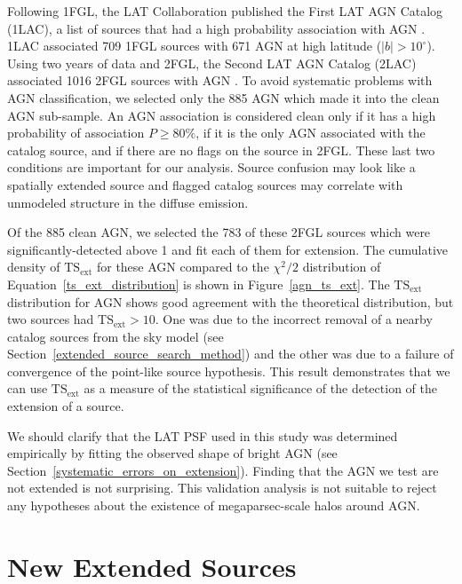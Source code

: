 \documentclass[12pt,preprint]{aastex}
\newcommand{\gev}{\text{GeV}\xspace}
\newcommand{\tsext}{{\ensuremath{\text{TS}_{\text{ext}}}}\xspace}
\newcommand{\degree}{^\circ\xspace}
\begin{document}
Following 1FGL, the LAT Collaboration published the First LAT AGN Catalog
(1LAC), a list of sources that had a high probability association with
AGN \citep{first_agn_cat}.  1LAC associated 709 1FGL sources with 671
AGN at high latitude ($|b|>10\degree$).  Using two years of data
and 2FGL, the Second LAT AGN Catalog (2LAC) associated 1016 2FGL sources
with AGN \citep{second_agn_cat}.  To avoid systematic problems with AGN
classification, we selected only the 885 AGN which made it into
the clean AGN sub-sample.  An AGN association is considered clean only
if it has a high probability of association $P\ge 80\%$, if it is the
only AGN associated with the catalog source, and if there are no flags
on the source in 2FGL. These last two conditions are important for our
analysis. Source confusion may look like a spatially extended source
and flagged catalog sources may correlate with unmodeled structure in
the diffuse emission.

Of the 885 clean AGN, we selected the 783 of these 2FGL sources which
were significantly-detected above 1 \gev and fit each of them for extension.
The cumulative density of \tsext for these AGN compared to the
$\chi^2/2$ distribution of Equation~\ref{ts_ext_distribution}
is
shown in Figure~\ref{agn_ts_ext}. 
The \tsext distribution for AGN shows good agreement with the
theoretical distribution, but two sources had $\tsext>10$.  One was due
to the incorrect removal of a nearby catalog sources from
the sky model (see
Section~\ref{extended_source_search_method}) and the other was due to a
failure of convergence of the point-like source hypothesis.  This result demonstrates
that we can use \tsext as a measure of the statistical significance of
the detection of the extension of a source.

We should clarify that the LAT PSF used in this study was determined
empirically by fitting the observed shape of bright AGN (see
Section~\ref{systematic_errors_on_extension}). Finding that the AGN we
test are not extended is not surprising.  This validation analysis is
not suitable to reject any hypotheses about the existence of megaparsec-scale
halos around AGN.

\section{New Extended Sources}
\label{new_ext_srcs_section}

\end{document}

